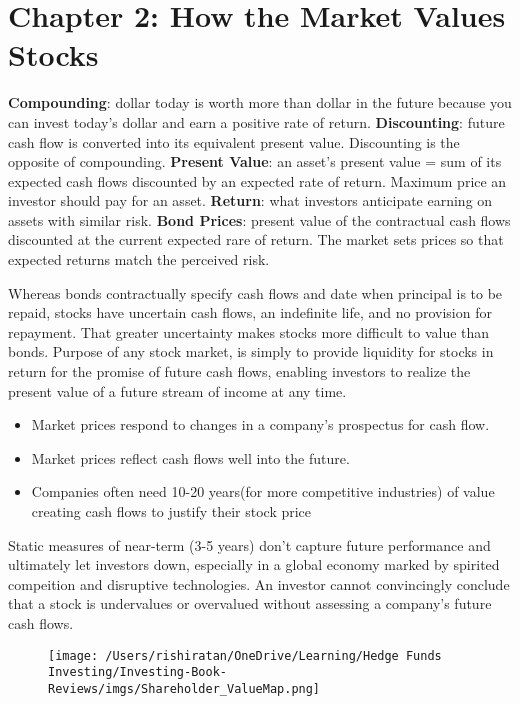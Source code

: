 \documentclass[english,titlepage]{article}
\begin{document}
\section{Chapter 2: How the Market Values Stocks}
\textbf{Compounding}: dollar today is worth more than dollar in the future because you can invest today's dollar and earn a positive rate of return. 
\vspace {0.3 cm}
  \newline
\textbf{Discounting}: future cash flow is converted into its equivalent present value. Discounting is the opposite of compounding. 
\vspace {0.3 cm}
  \newline
\textbf{Present Value}: an asset's present value = sum of its expected cash flows discounted by an expected rate of return. Maximum price an investor should pay for an asset. 
\vspace {0.3 cm}
  \newline
\textbf{Return}: what investors anticipate earning on assets with similar risk. 
\vspace {0.3 cm}
  \newline
\textbf{Bond Prices}: present value of the contractual cash flows discounted at the current expected rare of return. The market sets prices so that expected returns match the perceived risk. 
\begin{tcolorbox}[colback=blue!5!white,colframe=blue!75!black]
    Whereas bonds contractually specify cash flows and date when principal is to be repaid, stocks have uncertain cash flows, an indefinite life, and no provision for repayment. That greater uncertainty makes stocks more difficult to value than bonds. 
    \vspace {0.3 cm}
      \newline
    Purpose of any stock market, is simply to provide liquidity for stocks in return for the promise of future cash flows, enabling investors to realize the present value of a future stream of income at any time.
    \begin{itemize}
        \item Market prices respond to changes in a company's prospectus for cash flow. 
        \item Market prices reflect cash flows well into the future. 
        \item Companies often need 10-20 years(for more competitive industries) of value creating cash flows to justify their stock price
    \end{itemize}
    Static measures of near-term (3-5 years) don't capture future performance and ultimately let investors down, especially in a global economy marked by spirited compeition and disruptive technologies. An investor cannot convincingly conclude that a stock is undervalues or overvalued without assessing a company's future cash flows.
\end{tcolorbox}
\begin{figure}[H]
    \centering
    \texttt{[image: /Users/rishiratan/OneDrive/Learning/Hedge Funds Investing/Investing-Book-Reviews/imgs/Shareholder\_ValueMap.png]}
\end{figure}
\end{document}
